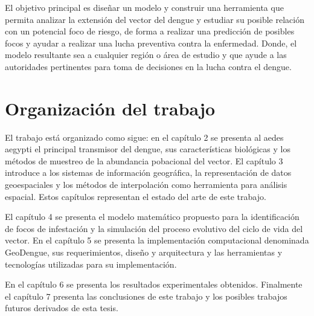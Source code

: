 El objetivo principal es diseñar un modelo y construir una herramienta que permita analizar la
extensión del vector del dengue y estudiar su posible relación con un potencial foco de riesgo, de
forma a realizar una predicción de posibles focos y ayudar a realizar una lucha preventiva contra
la enfermedad. Donde, el modelo resultante sea a cualquier región o área de estudio y
que ayude a las autoridades pertinentes para toma de decisiones en la lucha contra el dengue.

\section{Organización del trabajo}
El trabajo está organizado como sigue: en el capítulo 2 se presenta al aedes aegypti el principal
transmisor del dengue, sus características biológicas y los métodos de muestreo de la abundancia
pobacional del vector. El capítulo 3 introduce a los sistemas de información geográfica, la
representación de datos geoespaciales y los métodos de interpolación como herramienta para
análisis espacial. Estos capítulos representan el estado del arte de este trabajo.

El capítulo 4 se presenta el modelo matemático propuesto para la identificación de focos de
infestación y la simulación del proceso evolutivo del ciclo de vida del vector. En el capítulo 5
se presenta la implementación computacional denominada GeoDengue, sus requerimientos, diseño y
arquitectura y las herramientas y tecnologías utilizadas para su implementación.

En el capítulo 6 se presenta los resultados experimentales obtenidos. Finalmente el capítulo 7
presenta las conclusiones de este trabajo y los  posibles trabajos futuros derivados de esta tesis.
